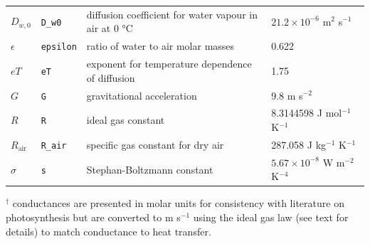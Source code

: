 \documentclass[11pt, oneside]{article}
\newcommand{\code}[1]{{\texttt{#1}}}
\begin{document}
\begin{table}[ht]
\begin{center}
{\begin{tabular}{llll}
  $D_{w,0}$        & \code{D\_w0}   & diffusion coefficient for water vapour in air at 0 °C & $21.2 \times 10^{-6}$ m$^2$ s$^{-1}$ \\
  $\epsilon$       & \code{epsilon} & ratio of water to air molar masses & 0.622 \\
  $\mathit{eT}$    & \code{eT}      & exponent for temperature dependence of diffusion & 1.75 \\
  $G$              & \code{G}       & gravitational acceleration & 9.8 m s$^{-2}$ \\
  $R$              & \code{R}       & ideal gas constant & 8.3144598 J mol$^{-1}$ K$^{-1}$ \\
  $R_\mathrm{air}$ & \code{R\_air}  & specific gas constant for dry air & 287.058 J kg$^{-1}$ K$^{-1}$ \\
  $\sigma$         & \code{s}       & Stephan-Boltzmann constant & $5.67 \times 10 ^ {-8}$ W m$^{-2}$ K$^{-4}$ \\

\bottomrule

\end{tabular}}
\end{center}
{$^\dagger$ conductances are presented in molar units for consistency with literature on photosynthesis but are converted to m s$^{-1}$ using the ideal gas law (see text for details) to match conductance to heat transfer.}

\label{table:table_input}
\end{table}
\end{document}
